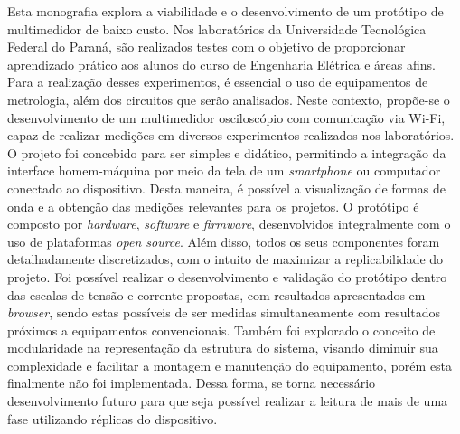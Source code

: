 

\begin{resumoutfpr}%
Esta monografia explora a viabilidade e o desenvolvimento de um protótipo de multimedidor de baixo custo. Nos laboratórios da Universidade Tecnológica Federal do Paraná, são realizados testes com o objetivo de proporcionar aprendizado prático aos alunos do curso de Engenharia Elétrica e áreas afins. Para a realização desses experimentos, é essencial o uso de equipamentos de metrologia, além dos circuitos que serão analisados.
Neste contexto, propõe-se o desenvolvimento de um multimedidor osciloscópio com comunicação via \gls{Wi-Fi}, capaz de realizar medições em diversos experimentos realizados nos laboratórios. O projeto foi concebido para ser simples e didático, permitindo a integração da interface homem-máquina por meio da tela de um \textit{smartphone} ou computador conectado ao dispositivo. Desta maneira, é possível a visualização de formas de onda e a obtenção das medições relevantes para os projetos.
O protótipo é composto por \textit{hardware}, \textit{software} e \textit{firmware}, desenvolvidos integralmente com o uso de plataformas \textit{open source}. Além disso, todos os seus componentes foram detalhadamente discretizados, com o intuito de maximizar a replicabilidade do projeto.
Foi possível realizar o desenvolvimento e validação do protótipo dentro das escalas de tensão e corrente propostas, com resultados apresentados em \textit{browser}, sendo estas possíveis de ser medidas simultaneamente com resultados próximos a equipamentos convencionais.  
Também foi explorado o conceito de modularidade na representação da estrutura do sistema, visando diminuir sua complexidade e facilitar a montagem e manutenção do equipamento, porém esta finalmente não foi implementada. Dessa forma, se torna necessário desenvolvimento futuro para que seja possível realizar a leitura de mais de uma fase utilizando réplicas do dispositivo.
\end{resumoutfpr}

